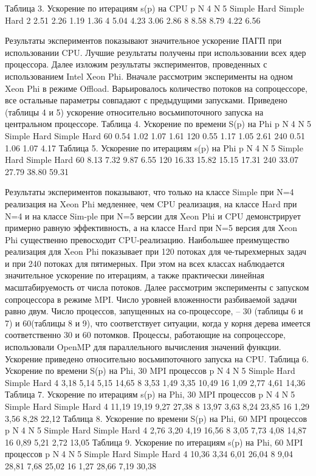 Таблица 3. Ускорение по итерациям s(p) на CPU
p	N4	N5
	Simple	Hard	Simple	Hard
2	2.51	2.26	1.19	1.36
4	5.04	4.23	3.06	2.86
8	8.58	8.79	4.22	6.56

Результаты экспериментов показывают значительное ускорение ПАГП при использовании CPU. Лучшие результаты получены при использовании всех ядер процессора.
Далее изложим результаты экспериментов, проведенных с использованием Intel Xeon Phi. Вначале рассмотрим эксперименты на одном Xeon Phi в режиме Offload. Варьировалось количество потоков на сопроцессоре, все остальные параметры совпадают с предыдущими запусками. Приведено (таблицы 4 и 5) ускорение относительно восьмипоточного запуска на центральном процессоре.
Таблица 4. Ускорение по времени S(p) на Phi
p	N4	N5
	Simple	Hard	Simple	Hard
60	0.54	1.02	1.07	1.61
120	0.55	1.17	1.05	2.61
240	0.51	1.06	1.07	4.17
Таблица 5. Ускорение по итерациям s(p) на Phi
p	N4	N5
	Simple	Hard	Simple	Hard
60	8.13	7.32	9.87	6.55
120	16.33	15.82	15.15	17.31
240	33.07	27.79	38.80	59.31

Результаты экспериментов показывают, что только на классе Simple при N=4 реализация на Xeon Phi медленнее, чем CPU реализация, на классе Hard при N=4 и на классе Sim-ple при N=5 версии для Xeon Phi и CPU демонстрирует примерно равную эффективность, а на классе Hard при N=5 версия для Xeon Phi существенно превосходит CPU-реализацию. Наибольшее преимущество реализация для Xeon Phi показывает при 120 потоках для че-тырехмерных задач и при 240 потоках для пятимерных. При этом на всех классах наблюдается значительное ускорение по итерациям, а также практически линейная масштабируемость от числа потоков.
Далее рассмотрим эксперименты с запуском сопроцессора в режиме MPI. Число уровней вложенности разбиваемой задачи равно двум. Число процессов, запущенных на со-процессоре, – 30 (таблицы 6 и 7) и 60(таблицы 8 и 9), что соответствует ситуации, когда у корня дерева имеется соответственно 30 и 60 потомков. Процессы, работающие на сопроцессоре, использовали OpenMP для параллельного вычисления значений функции. Ускорение приведено относительно восьмипоточного запуска на CPU.
Таблица 6. Ускорение по времени S(p) на Phi, 30 MPI процессов
p	N4	N5
	Simple	Hard	Simple	Hard
4	3,18	5,14	5,15	14,65
8	3,53	1,49	3,35	10,49
16	1,09	2,77	4,61	14,36
Таблица 7. Ускорение по итерациям s(p) на Phi, 30 MPI процессов
p	N4	N5
	Simple	Hard	Simple	Hard
4	11,19	19,19	9,27	27,38
8	13,97	3,63	8,24	23,85
16	1,29	3,56	8,28	22,12
Таблица 8. Ускорение по времени S(p) на Phi, 60 MPI процессов
p	N4	N5
	Simple	Hard	Simple	Hard
4	2,76	3,20	4,19	16,56
8	3,05	7,73	4,08	14,87
16	0,89	5,21	2,72	13,05
Таблица 9. Ускорение по итерациям s(p) на Phi, 60 MPI процессов
p	N4	N5
	Simple	Hard	Simple	Hard
4	10,36	3,34	6,01	26,04
8	9,04	28,81	7,68	25,02
16	1,27	28,66	7,19	30,38

